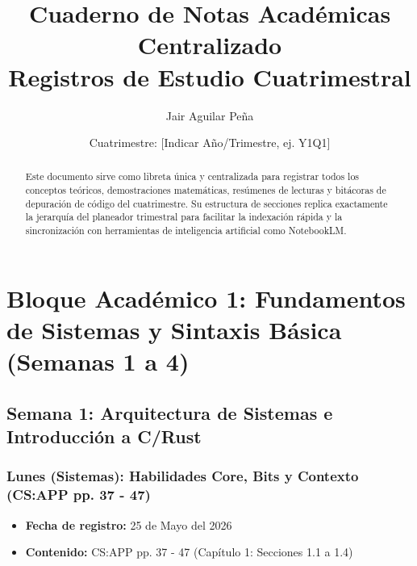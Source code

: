\documentclass[11pt, a4paper]{article}
\title{\textbf{\color{primary}Cuaderno de Notas Académicas Centralizado\\ \large Registros de Estudio Cuatrimestral}}
\author{Jair Aguilar Peña}
\date{Cuatrimestre: [Indicar Año/Trimestre, ej. Y1Q1]}
\begin{document}

\maketitle

\begin{abstract}
Este documento sirve como libreta única y centralizada para registrar todos los conceptos teóricos, demostraciones matemáticas, resúmenes de lecturas y bitácoras de depuración de código del cuatrimestre. Su estructura de secciones replica exactamente la jerarquía del planeador trimestral para facilitar la indexación rápida y la sincronización con herramientas de inteligencia artificial como NotebookLM.
\end{abstract}

\tableofcontents
\newpage

\section{Bloque Académico 1: Fundamentos de Sistemas y Sintaxis Básica (Semanas 1 a 4)}

\subsection{Semana 1: Arquitectura de Sistemas e Introducción a C/Rust}

\subsubsection{Lunes (Sistemas): Habilidades Core, Bits y Contexto (CS:APP pp. 37 - 47)}
\begin{itemize}
  \item[] \textbf{Fecha de registro:} 25 de Mayo del 2026
  \item[] \textbf{Contenido:} CS:APP pp. 37 - 47 (Capítulo 1: Secciones 1.1 a 1.4)
\end{itemize}
\end{document}
